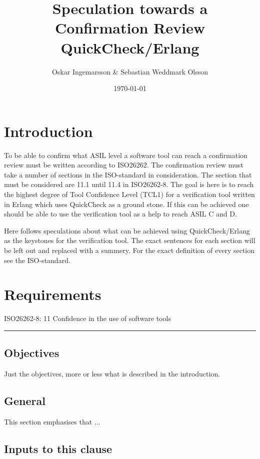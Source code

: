 \documentclass{article}
\title{Speculation towards a Confirmation Review \\ QuickCheck/Erlang}
\author{Oskar Ingemarsson \& Sebastian Weddmark Olsson}
\date{\today}
\begin{document}
\maketitle
\section{Introduction}
To be able to confirm what ASIL level a software tool can reach a confirmation
review must be written according to ISO26262. The confirmation review must take
a number of sections in the ISO-standard in consideration. The section that must
be considered are 11.1 until 11.4 in ISO26262-8. The goal is here is to reach
the highest degree of Tool Confidence Level (TCL1) for a verification tool
written in Erlang which uses QuickCheck as a ground stone. If this can be
achieved one should be able to use the verification tool as a help to reach ASIL
C and D.

Here follows speculations about what can be achieved using QuickCheck/Erlang
as the keystones for the verification tool. The exact sentences for each section
will be left out and replaced with a summery. For the
exact definition of every section see the ISO-standard.

\section{Requirements}

\setcounter{oldcounter}{\value{section}}
\setcounter{section}{11}
\renewcommand\paragraph[1]{\refstepcounter{paragraph}\theparagraph~#1\\}

\begin{bf}
ISO26262-8: 11 Confidence in the use of software tools \\
\end{bf}
\hrule
\subsection{Objectives}
Just the objectives, more or less what is described in the introduction.
\subsection{General}
This section emphasises that ...
\subsection{Inputs to this clause}
\end{document}
